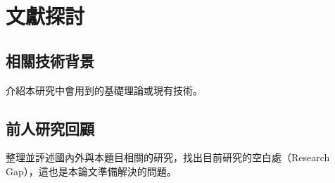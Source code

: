 \chapter{文獻探討}
\label{cha:CH2-Relative-Work} 

\section{相關技術背景}
介紹本研究中會用到的基礎理論或現有技術。

\section{前人研究回顧}
整理並評述國內外與本題目相關的研究，找出目前研究的空白處（Research Gap），這也是本論文準備解決的問題。